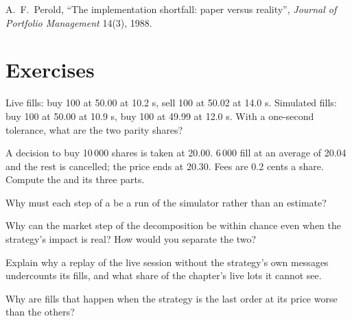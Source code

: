 \begin{omsources}
\item A.~F.~Perold, ``The implementation shortfall: paper versus reality'', \emph{Journal of Portfolio Management} 14(3), 1988.
\end{omsources}

\section{Exercises}

\begin{exercise}[$\star$]\label{exo:rs:simulation-versus-live:1}
Live fills: buy 100 at 50.00 at 10.2 s, sell 100 at 50.02 at 14.0 s. Simulated fills: buy 100 at 50.00 at 10.9 s, buy 100 at 49.99 at 12.0 s. With a one-second
tolerance, what are the two parity shares?
\end{exercise}

\begin{exercise}[$\star$]\label{exo:rs:simulation-versus-live:2}
A decision to buy 10\,000 shares is taken at 20.00. 6\,000 fill at an average of 20.04 and the rest is cancelled; the price ends at 20.30. Fees are 0.2 cents a share.
Compute the  and its three parts.
\end{exercise}

\begin{exercise}[$\star$]\label{exo:rs:simulation-versus-live:3}
Why must each step of a  be a run of the simulator rather than an estimate?
\end{exercise}

\begin{exercise}[$\star\star$]\label{exo:rs:simulation-versus-live:4}
Why can the market step of the decomposition be within chance even when the strategy's impact is real? How would you separate the two?
\end{exercise}

\begin{exercise}[$\star\star$]\label{exo:rs:simulation-versus-live:5}
Explain why a replay of the live session without the strategy's own messages undercounts its fills, and what share of the chapter's live lots it cannot see.
\end{exercise}

\begin{exercise}[$\star\star$]\label{exo:rs:simulation-versus-live:6}
Why are fills that happen when the strategy is the last order at its price worse than the others?
\end{exercise}

